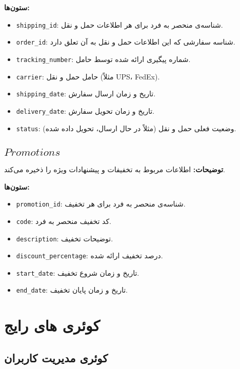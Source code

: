 \documentclass[12pt]{article}
\begin{document}
\textbf{ستون‌ها:}
\begin{itemize}
    \item \texttt{shipping\_id}: شناسه‌ی منحصر به فرد برای هر اطلاعات حمل و نقل.
    \item \texttt{order\_id}: شناسه سفارشی که این اطلاعات حمل و نقل به آن تعلق دارد.
    \item \texttt{tracking\_number}: شماره پیگیری ارائه شده توسط حامل.
    \item \texttt{carrier}: حامل حمل و نقل (مثلاً UPS، FedEx).
    \item \texttt{shipping\_date}: تاریخ و زمان ارسال سفارش.
    \item \texttt{delivery\_date}: تاریخ و زمان تحویل سفارش.
    \item \texttt{status}: وضعیت فعلی حمل و نقل (مثلاً در حال ارسال، تحویل داده شده).
\end{itemize}

\subsection{\(Promotions\)}

\textbf{توضیحات:} اطلاعات مربوط به تخفیفات و پیشنهادات ویژه را ذخیره می‌کند.

\textbf{ستون‌ها:}
\begin{itemize}
    \item \texttt{promotion\_id}: شناسه‌ی منحصر به فرد برای هر تخفیف.
    \item \texttt{code}: کد تخفیف منحصر به فرد.
    \item \texttt{description}: توضیحات تخفیف.
    \item \texttt{discount\_percentage}: درصد تخفیف ارائه شده.
    \item \texttt{start\_date}: تاریخ و زمان شروع تخفیف.
    \item \texttt{end\_date}: تاریخ و زمان پایان تخفیف.
\end{itemize}

\section{کوئری های رایج}

\subsection{کوئری مدیریت کاربران}
\end{document}
